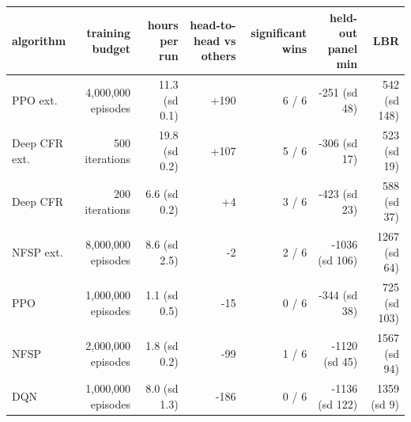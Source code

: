\begin{tabular}{lrrrrrr}
\toprule
algorithm & training budget & hours per run & head-to-head vs others & significant wins & held-out panel min & LBR \\
\midrule
PPO ext. & 4,000,000 episodes & 11.3 (sd 0.1) & +190 & 6 / 6 & -251 (sd 48) & 542 (sd 148) \\
Deep CFR ext. & 500 iterations & 19.8 (sd 0.2) & +107 & 5 / 6 & -306 (sd 17) & 523 (sd 19) \\
Deep CFR & 200 iterations & 6.6 (sd 0.2) & +4 & 3 / 6 & -423 (sd 23) & 588 (sd 37) \\
NFSP ext. & 8,000,000 episodes & 8.6 (sd 2.5) & -2 & 2 / 6 & -1036 (sd 106) & 1267 (sd 64) \\
PPO & 1,000,000 episodes & 1.1 (sd 0.5) & -15 & 0 / 6 & -344 (sd 38) & 725 (sd 103) \\
NFSP & 2,000,000 episodes & 1.8 (sd 0.2) & -99 & 1 / 6 & -1120 (sd 45) & 1567 (sd 94) \\
DQN & 1,000,000 episodes & 8.0 (sd 1.3) & -186 & 0 / 6 & -1136 (sd 122) & 1359 (sd 9) \\
\bottomrule
\end{tabular}
